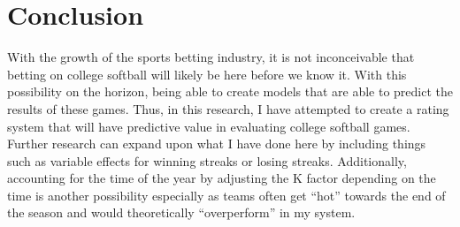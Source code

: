\documentclass{article}
\begin{document}
\section{\textbf{Conclusion}}
	With the growth of the sports betting industry, it is not inconceivable that betting on college softball will likely be here before we know it. With this possibility on the horizon, being able to create models that are able to predict the results of these games. Thus, in this research, I have attempted to create a rating system that will have predictive value in evaluating college softball games. Further research can expand upon what I have done here by including things such as variable effects for winning streaks or losing streaks. Additionally, accounting for the time of the year by adjusting the K factor depending on the time is another possibility especially as teams often get “hot” towards the end of the season and would theoretically “overperform” in my system. 


\end{document}
